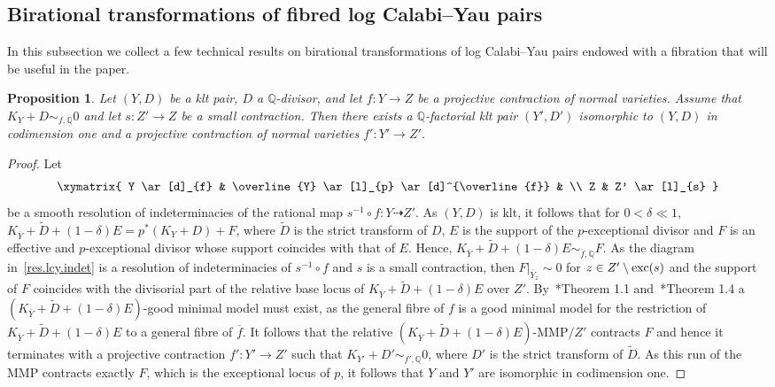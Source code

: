 \documentclass[11pt]{ip-journal}
\newtheorem{proposition}[theorem]{Proposition}
\theoremstyle{definition}
\begin{document}
\subsection{Birational transformations of fibred log Calabi--Yau pairs}
\label{sect.trans.fib.lcy}

In this subsection we collect a few technical results on birational transformations of log Calabi--Yau pairs endowed with a fibration that will be useful in the paper.

\begin{proposition}
\label{small.qfact.lcy.prop}
 Let $(Y, D)$ be a klt pair, $D$ a $\mathbb{Q}$-divisor, and let $f \colon Y \to Z$ be a projective contraction of normal varieties.
 Assume that $K_Y+D \sim_{f, \mathbb{Q}} 0$ and let $s\colon Z' \to Z$ be a small contraction.
Then there exists a 
$\mathbb{Q}$-factorial 
klt pair 
$(Y', D')$ 
isomorphic to 
$(Y, D)$ 
in codimension one and a projective contraction of normal varieties 
$f' \colon Y' \to Z'$.
\end{proposition}

\begin{proof}
Let 
\begin{align}
\label{res.lcy.indet}
	\xymatrix{
Y \ar[d]_{f} & 
\overline{Y} \ar[l]_{p} \ar[d]^{\overline{f}} & 
\\
Z & 
Z' \ar[l]_{s}
			}
\end{align}
be a smooth resolution of indeterminacies of the rational map 
$s^{-1} \circ f \colon Y \dashrightarrow Z'$.
As 
$(Y, D)$ 
is klt, it follows that for 
$0< \delta \ll 1$, 
$K_{\overline{Y}}+ \tilde{D} + (1-\delta) E= p^\ast (K_Y+D) + F$, 
where 
$\tilde{D}$ 
is the strict transform of 
$D$, 
$E$ 
is the support of the 
$p$-exceptional 
divisor and 
$F$ 
is an effective and 
$p$-exceptional 
divisor whose support coincides with that of 
$E$.
Hence, 
$K_{\overline{Y}}+ \tilde{D} + (1-\delta) E 
\sim_{\overline{f}, \mathbb{Q}} F$.
As the diagram in~\eqref{res.lcy.indet} is a resolution of indeterminacies of 
$s^{-1} \circ f$ 
and 
$s$ 
is a small contraction, 
then 
$F \vert_{\overline{Y}_z} \sim 0$
for
$z \in Z' \setminus {\rm exc}(s)$ and
the support of $F$ coincides with the divisorial part of the relative base locus of $K_{\overline{Y}}+ \tilde{D} + (1-\delta) E$ over $Z'$.
By~\cite{HX}*{Theorem 1.1} and~\cite{MR2929730}*{Theorem 1.4} a $(K_{\overline{Y}}+ \tilde{D} + (1-\delta) E)$-good minimal model must exist, as the general fibre of $f$ is a good minimal model for the restriction of $K_{\overline{Y}}+ \tilde{D} + (1-\delta) E$ to a general fibre of $\overline{f}$.
It follows that the relative $(K_{\overline{Y}} +\tilde{D} + (1-\delta) E)$-MMP$/Z'$ contracts $F$ and hence it terminates with a projective contraction $f' \colon Y' \to Z'$ such that $K_{Y'} +D' \sim_{f', \mathbb{Q}} 0$, where $D'$ is the strict transform of $\tilde{D}$.
As this run of the MMP contracts exactly $F$, which is the exceptional locus of $p$, it follows that $Y$ and $Y'$ are isomorphic in codimension one.
\end{proof}
\end{document}
